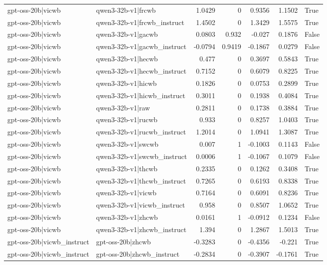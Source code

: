 \begin{table}
\begin{tabular}{l l r r r r l}
gpt-oss-20b|vicwb & qwen3-32b-v1|frcwb & 1.0429 & 0 & 0.9356 & 1.1502 & True \\
gpt-oss-20b|vicwb & qwen3-32b-v1|frcwb_instruct & 1.4502 & 0 & 1.3429 & 1.5575 & True \\
gpt-oss-20b|vicwb & qwen3-32b-v1|gacwb & 0.0803 & 0.932 & -0.027 & 0.1876 & False \\
gpt-oss-20b|vicwb & qwen3-32b-v1|gacwb_instruct & -0.0794 & 0.9419 & -0.1867 & 0.0279 & False \\
gpt-oss-20b|vicwb & qwen3-32b-v1|hecwb & 0.477 & 0 & 0.3697 & 0.5843 & True \\
gpt-oss-20b|vicwb & qwen3-32b-v1|hecwb_instruct & 0.7152 & 0 & 0.6079 & 0.8225 & True \\
gpt-oss-20b|vicwb & qwen3-32b-v1|hicwb & 0.1826 & 0 & 0.0753 & 0.2899 & True \\
gpt-oss-20b|vicwb & qwen3-32b-v1|hicwb_instruct & 0.3011 & 0 & 0.1938 & 0.4084 & True \\
gpt-oss-20b|vicwb & qwen3-32b-v1|raw & 0.2811 & 0 & 0.1738 & 0.3884 & True \\
gpt-oss-20b|vicwb & qwen3-32b-v1|rucwb & 0.933 & 0 & 0.8257 & 1.0403 & True \\
gpt-oss-20b|vicwb & qwen3-32b-v1|rucwb_instruct & 1.2014 & 0 & 1.0941 & 1.3087 & True \\
gpt-oss-20b|vicwb & qwen3-32b-v1|swcwb & 0.007 & 1 & -0.1003 & 0.1143 & False \\
gpt-oss-20b|vicwb & qwen3-32b-v1|swcwb_instruct & 0.0006 & 1 & -0.1067 & 0.1079 & False \\
gpt-oss-20b|vicwb & qwen3-32b-v1|thcwb & 0.2335 & 0 & 0.1262 & 0.3408 & True \\
gpt-oss-20b|vicwb & qwen3-32b-v1|thcwb_instruct & 0.7265 & 0 & 0.6193 & 0.8338 & True \\
gpt-oss-20b|vicwb & qwen3-32b-v1|vicwb & 0.7164 & 0 & 0.6091 & 0.8236 & True \\
gpt-oss-20b|vicwb & qwen3-32b-v1|vicwb_instruct & 0.958 & 0 & 0.8507 & 1.0652 & True \\
gpt-oss-20b|vicwb & qwen3-32b-v1|zhcwb & 0.0161 & 1 & -0.0912 & 0.1234 & False \\
gpt-oss-20b|vicwb & qwen3-32b-v1|zhcwb_instruct & 1.394 & 0 & 1.2867 & 1.5013 & True \\
gpt-oss-20b|vicwb_instruct & gpt-oss-20b|zhcwb & -0.3283 & 0 & -0.4356 & -0.221 & True \\
gpt-oss-20b|vicwb_instruct & gpt-oss-20b|zhcwb_instruct & -0.2834 & 0 & -0.3907 & -0.1761 & True \\

\end{tabular}
\end{table}
